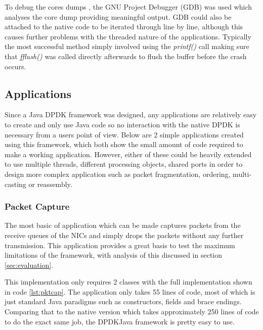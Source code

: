 \documentclass[final_report.tex]{subfiles}
\begin{document}
To debug the cores dumps \cite{codegeeks1}, the GNU Project Debugger (GDB) was used which analyses the core dump providing meaningful output. GDB could also be attached to the native code to be iterated through line by line, although this causes further problems with the threaded nature of the applications. Typically the most successful method simply involved using the \textit{printf()} call making sure that \textit{fflush()} was called directly afterwards to flush the buffer before the crash occurs.

\newpage

\subsection{Applications}
\label{sec:apps}
Since a Java DPDK framework was designed, any applications are relatively easy to create and only use Java code so no interaction with the native DPDK is necessary from a users point of view. Below are 2 simple applications created using this framework, which both show the small amount of code required to make a working application. However, either of these could be heavily extended to use multiple threads, different processing objects, shared ports in order to design more complex application such as packet fragmentation, ordering, multi-casting or reassembly.

\subsubsection{Packet Capture}
The most basic of application which can be made captures packets from the receive queues of the NICs and simply drops the packets without any further transmission. This application provides a great basis to test the maximum limitations of the framework, with analysis of this discussed in section \ref{sec:evaluation}.

This implementation only requires 2 classes with the full implementation shown in code \ref{lst:pktcap}. The application only takes 55 lines of code, most of which is just standard Java paradigms such as constructors, fields and brace endings. Comparing that to the native version which takes approximately 250 lines of code to do the exact same job, the DPDKJava framework is pretty easy to use.
\end{document}
